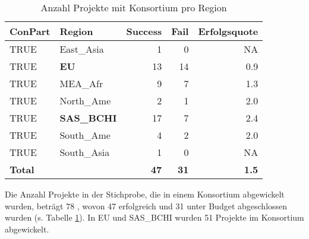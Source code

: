 %
%
\begin{table}[H]
	\centering
	\caption{Anzahl Projekte mit Konsortium pro Region}
	\begin{tabular}{lrrrr}
		\textbf{ConPart} & \multicolumn{1}{l}{\textbf{Region}} & \multicolumn{1}{l}{\textbf{Success}} & \multicolumn{1}{l}{\textbf{Fail}} & \multicolumn{1}{l}{\textbf{Erfolgsquote}} \\\hline
		TRUE  & \multicolumn{1}{l}{East\_Asia} & 1     & 0     & NA \\
		TRUE  & \multicolumn{1}{l}{\textbf{EU}} & 13    & 14    & 0.9 \\
		TRUE  & \multicolumn{1}{l}{MEA\_Afr} & 9     & 7     & 1.3 \\
		TRUE  & \multicolumn{1}{l}{North\_Ame} & 2     & 1     & 2.0 \\
		TRUE  & \multicolumn{1}{l}{\textbf{SAS\_BCHI}} & 17    & 7     & 2.4 \\
		TRUE  & \multicolumn{1}{l}{South\_Ame} & 4     & 2     & 2.0 \\
		TRUE  & \multicolumn{1}{l}{South\_Asia} & 1     & 0     & NA \\\hline
		\textbf{Total} &       & \textbf{47} & \textbf{31} & \textbf{1.5} \\
	\end{tabular}%
	\label{fcons}%
\end{table}%
Die Anzahl Projekte in der Stichprobe, die in einem Konsortium abgewickelt wurden, beträgt 78 , wovon 47 erfolgreich und 31 unter Budget abgeschlossen wurden (s. Tabelle \ref{fcons}). In EU und SAS\_BCHI wurden 51 Projekte im Konsortium abgewickelt. 
